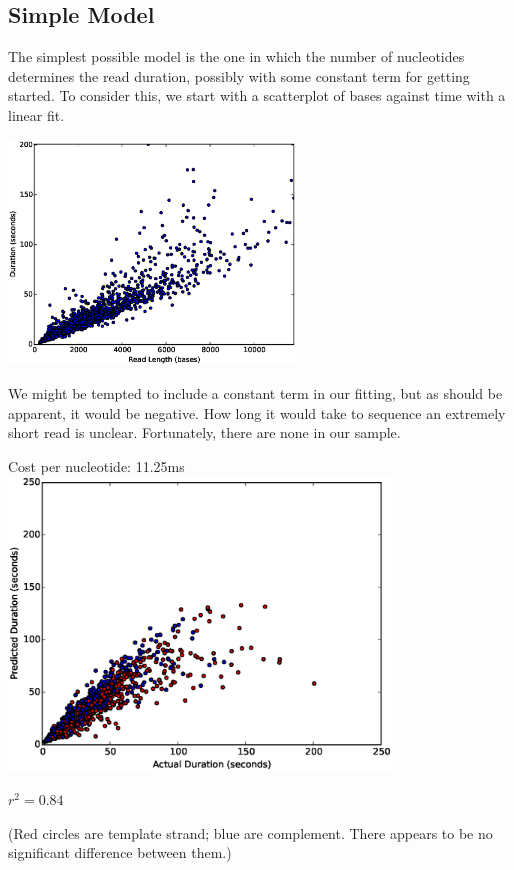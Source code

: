 \subsection*{Simple Model}

        The simplest possible model is the one in which the number of nucleotides determines the read duration,
        possibly with some constant term for getting started.  To consider this, we start with a scatterplot of
        bases against time with a linear fit.

        \includegraphics[width=3in]{part11scatterbd}

        We might be tempted to include a constant term in our fitting, but as should be apparent, it would be
        negative.  How long it would take to sequence an extremely short read is unclear.  Fortunately, there 
        are none in our sample.
        
Cost per nucleotide: 11.25ms\\
\includegraphics[width=4in]{part11scatter0mer}

$r^2=0.84$


(Red circles are template strand; blue are complement.  There appears to be no significant difference between them.)


